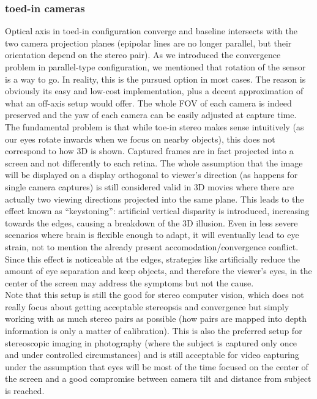 \subsubsection{toed-in cameras}
Optical axis in toed-in configuration converge and baseline intersects with the two camera projection planes (epipolar lines are no longer parallel, but their orientation depend on the stereo pair). As we introduced the convergence problem in parallel-type configuration, we mentioned that rotation of the sensor is a way to go. In reality, this is the pursued option in most cases. The reason is obviously its easy and low-cost implementation, plus a decent approximation of what an off-axis setup would offer. The whole FOV of each camera is indeed preserved and the yaw of each camera can be easily adjusted at capture time. The fundamental problem is that while toe-in stereo makes sense intuitively (as our eyes rotate inwards when we focus on nearby objects), this does not correspond to how 3D is shown. Captured frames are in fact projected into a screen and not differently to each retina. The whole assumption that the image will be displayed on a display orthogonal to viewer’s direction (as happens for single camera captures) is still considered valid in 3D movies where there are actually two viewing directions projected into the same plane. This leads to the effect known as “keystoning”: artificial vertical disparity is introduced, increasing towards the edges, causing a breakdown of the 3D illusion. Even in less severe scenarios where brain is flexible enough to adapt, it will eventually lead to eye strain, not to mention the already present accomodation/convergence conflict. Since this effect is noticeable at the edges, strategies like artificially reduce the amount of eye separation and keep objects, and therefore the viewer’s eyes, in the center of the screen may address the symptoms but not the cause.\\
Note that this setup is still the good for stereo computer vision, which does not really focus about getting acceptable stereopsis and convergence but simply working with as much stereo pairs as possible (how pairs are mapped into depth information is only a matter of calibration). This is also the preferred setup for stereoscopic imaging in photography (where the subject is captured only once and under controlled circumstances) and is still acceptable for video capturing under the assumption that eyes will be most of the time focused on the center of the screen and a good compromise between camera tilt and distance from subject is reached.

